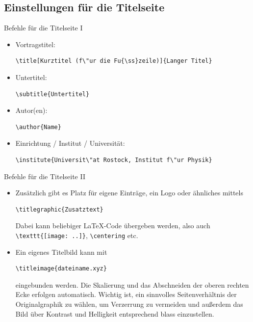 \documentclass[10pt]{beamer} %
\begin{document}
\subsection{Einstellungen f\"ur die Titelseite}
\begin{frame}[fragile]{Befehle f\"ur die Titelseite I}
  \begin{itemize}
  \item Vortragstitel:
  \begin{verbatim}
\title[Kurztitel (f\"ur die Fu{\ss}zeile)]{Langer Titel}
  \end{verbatim}

  \item Untertitel:
  \begin{verbatim}
\subtitle{Untertitel}
  \end{verbatim}

  \item Autor(en):
  \begin{verbatim}
\author{Name}
  \end{verbatim}

  \item Einrichtung / Institut / Universit\"at:
  \begin{verbatim}
\institute{Universit\"at Rostock, Institut f\"ur Physik}
  \end{verbatim}
  \end{itemize}
\end{frame}

\begin{frame}[fragile]{Befehle f\"ur die Titelseite II}
  \begin{itemize}
  \item Zus\"atzlich gibt es Platz f\"ur eigene Eintr\"age, ein Logo oder \"ahnliches mittels
  \begin{verbatim}
\titlegraphic{Zusatztext}
  \end{verbatim}
   Dabei kann beliebiger \LaTeX-Code \"ubergeben werden, also auch \verb+\texttt{[image: ..]}+, \verb+\centering+ etc.
  \item Ein eigenes Titelbild kann mit
  \begin{verbatim}
\titleimage{dateiname.xyz}
  \end{verbatim}
  eingebunden werden. Die Skalierung und das Abschneiden der oberen rechten Ecke erfolgen automatisch. Wichtig ist, ein sinnvolles Seitenverh\"altnis der Originalgraphik zu w\"ahlen, um Verzerrung zu vermeiden und au{\ss}erdem das Bild \"uber Kontrast und Helligkeit entsprechend blass einzustellen.
  \end{itemize}
\end{frame}
\end{document}
